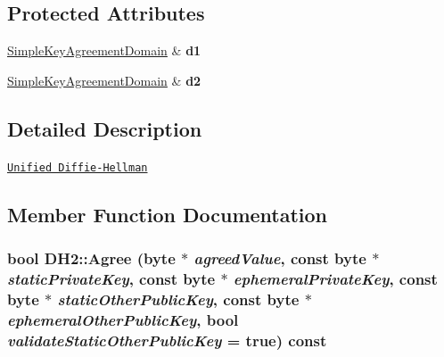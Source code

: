 \subsection*{Protected Attributes}
\begin{DoxyCompactItemize}
\item 
\hypertarget{class_d_h2_a37d787f31570d6289d6a3bf9aaeaf185}{
\hyperlink{class_simple_key_agreement_domain}{SimpleKeyAgreementDomain} \& {\bfseries d1}}
\label{class_d_h2_a37d787f31570d6289d6a3bf9aaeaf185}

\item 
\hypertarget{class_d_h2_a6dd273fb685b14e642d272b8a3ea13d4}{
\hyperlink{class_simple_key_agreement_domain}{SimpleKeyAgreementDomain} \& {\bfseries d2}}
\label{class_d_h2_a6dd273fb685b14e642d272b8a3ea13d4}

\end{DoxyCompactItemize}


\subsection{Detailed Description}
\href{http://www.weidai.com/scan-mirror/ka.html#DH2}{\tt Unified Diffie-\/Hellman} 

\subsection{Member Function Documentation}
\hypertarget{class_d_h2_a561ed549ab2f287bd5f72be06e217290}{
\subsubsection[{Agree}]{\setlength{\rightskip}{0pt plus 5cm}bool DH2::Agree (byte $\ast$ {\em agreedValue}, \/  const byte $\ast$ {\em staticPrivateKey}, \/  const byte $\ast$ {\em ephemeralPrivateKey}, \/  const byte $\ast$ {\em staticOtherPublicKey}, \/  const byte $\ast$ {\em ephemeralOtherPublicKey}, \/  bool {\em validateStaticOtherPublicKey} = {\ttfamily true}) const}}
\label{class_d_h2_a561ed549ab2f287bd5f72be06e217290}


